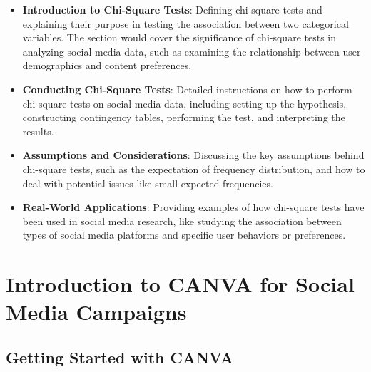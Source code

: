\documentclass[
]{book}
\providecommand{\tightlist}{%
  \setlength{\itemsep}{0pt}\setlength{\parskip}{0pt}}
\begin{document}
\begin{itemize}
\tightlist
\item
  \textbf{Introduction to Chi-Square Tests}: Defining chi-square tests and explaining their purpose in testing the association between two categorical variables. The section would cover the significance of chi-square tests in analyzing social media data, such as examining the relationship between user demographics and content preferences.
\item
  \textbf{Conducting Chi-Square Tests}: Detailed instructions on how to perform chi-square tests on social media data, including setting up the hypothesis, constructing contingency tables, performing the test, and interpreting the results.
\item
  \textbf{Assumptions and Considerations}: Discussing the key assumptions behind chi-square tests, such as the expectation of frequency distribution, and how to deal with potential issues like small expected frequencies.
\item
  \textbf{Real-World Applications}: Providing examples of how chi-square tests have been used in social media research, like studying the association between types of social media platforms and specific user behaviors or preferences.
\end{itemize}

\hypertarget{introduction-to-canva-for-social-media-campaigns}{%
\chapter{Introduction to CANVA for Social Media Campaigns}\label{introduction-to-canva-for-social-media-campaigns}}

\hypertarget{getting-started-with-canva}{%
\section*{Getting Started with CANVA}\label{getting-started-with-canva}}
\end{document}
